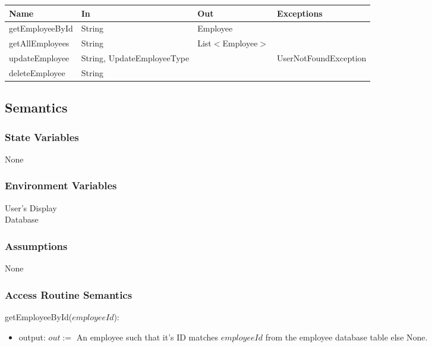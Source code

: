 \documentclass[12pt, titlepage]{article}
\begin{document}
\begin{center}
	\begin{adjustbox}{width=\textwidth}
		\begin{tabular}{llll}
			\hline
			\textbf{Name}   & \textbf{In}                & \textbf{Out}          & \textbf{Exceptions} \\
			\hline
			getEmployeeById & String                     & Employee              & ~                   \\
			getAllEmployees & String                     & List$<$Employee$>$    & ~                   \\
updateEmployee  & String, UpdateEmployeeType & ~                  & UserNotFoundException \\
			deleteEmployee  & String                     & ~                     & ~                   \\
			\hline
		\end{tabular}
	\end{adjustbox}
\end{center}

\subsection{Semantics}

\subsubsection{State Variables}

None

\subsubsection{Environment Variables}

User's Display \\ Database

\subsubsection{Assumptions}

None

\subsubsection{Access Routine Semantics}

\noindent getEmployeeById($employeeId$):
\begin{itemize}
	\item output: $out :=$ An employee such that it's ID matches $employeeId$ from the employee database
	      table else None.
\end{itemize}
\end{document}
